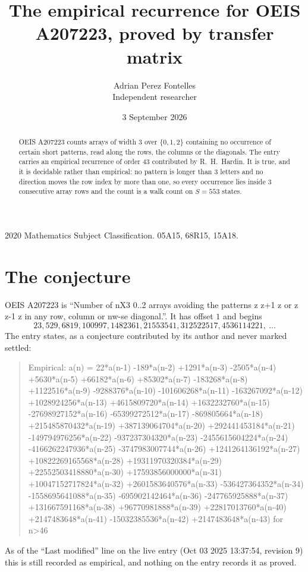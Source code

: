 \documentclass[11pt,a4paper]{article}
\title{The empirical recurrence for OEIS A207223, proved by transfer matrix}
\author{Adrian Perez Fontelles\\ \small Independent researcher}
\date{3 September 2026}
\theoremstyle{plain}
\theoremstyle{definition}
\begin{document}
\maketitle

\begin{abstract}
OEIS A207223 counts arrays of width $3$ over $\{0,1,2\}$ containing no occurrence of certain short
patterns, read along the rows, the columns or the diagonals. The entry carries an empirical
recurrence of order $43$ contributed by R.~H.~Hardin. It is true, and it is decidable
rather than empirical: no pattern is longer than $3$ letters and no direction moves the row
index by more than one, so every occurrence lies inside $3$ consecutive array rows and the
count is a walk count on $S=553$ states.
\end{abstract}

\noindent\small 2020 Mathematics Subject Classification. 05A15, 68R15, 15A18.\normalsize

\section{The conjecture}

OEIS A207223 is ``Number of nX3 0..2 arrays avoiding the patterns z z+1 z or z z-1 z in any row, column or nw-se diagonal.''. It has offset $1$ and begins
\[
23, 529, 6819, 100997, 1482361, 21553541, 312522517, 4536114221,\ \dots
\]
The entry states, as a conjecture contributed by its author and never marked settled:
\begin{quote}
Empirical: a(n) = 22*a(n-1) -189*a(n-2) +1291*a(n-3) -2505*a(n-4) +5630*a(n-5) +66182*a(n-6) +85302*a(n-7) -183268*a(n-8) +1122516*a(n-9) -9288376*a(n-10) -101606268*a(n-11) -163267092*a(n-12) +1028924256*a(n-13) +4615809720*a(n-14) +1632232760*a(n-15) -27698927152*a(n-16) -65399272512*a(n-17) -869805664*a(n-18) +215485870432*a(n-19) +387139064704*a(n-20) +292441453184*a(n-21) -149794976256*a(n-22) -937237304320*a(n-23) -2455615604224*a(n-24) -4166262247936*a(n-25) -3747983007744*a(n-26) +1241264136192*a(n-27) +10822269165568*a(n-28) +19311970320384*a(n-29) +22552503418880*a(n-30) +17593856000000*a(n-31) +10047152717824*a(n-32) +2601583640576*a(n-33) -536427364352*a(n-34) -1558695641088*a(n-35) -695902142464*a(n-36) -247765925888*a(n-37) +131667591168*a(n-38) +96770981888*a(n-39) +22817013760*a(n-40) +2147483648*a(n-41) -15032385536*a(n-42) +2147483648*a(n-43) for n>46
\end{quote}
As of the ``Last modified'' line on the live entry (Oct 03 2025 13:37:54, revision 9) this is still
recorded as empirical, and nothing on the entry records it as proved.
\end{document}
